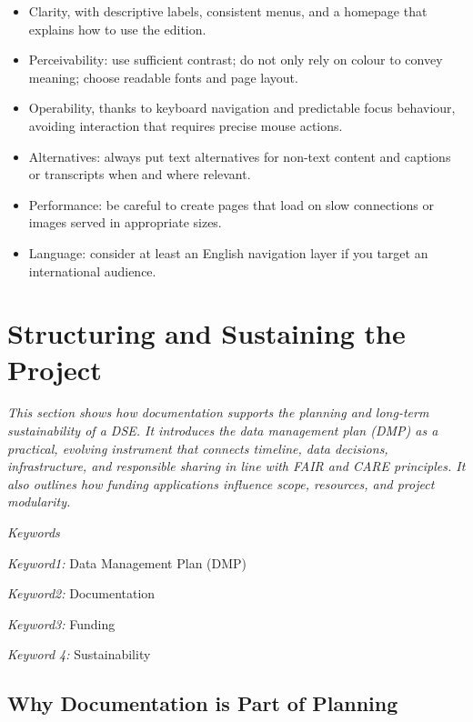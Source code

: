 \documentclass[
  letterpaper,
  DIV=11,
  numbers=noendperiod]{scrreprt}
\begin{document}
\begin{itemize}
\item
  Clarity, with descriptive labels, consistent menus, and a homepage
  that explains how to use the edition.
\item
  Perceivability: use sufficient contrast; do not only rely on colour to
  convey meaning; choose readable fonts and page layout.
\item
  Operability, thanks to keyboard navigation and predictable focus
  behaviour, avoiding interaction that requires precise mouse actions.
\item
  Alternatives: always put text alternatives for non-text content and
  captions or transcripts when and where relevant.
\item
  Performance: be careful to create pages that load on slow connections
  or images served in appropriate sizes.
\item
  Language: consider at least an English navigation layer if you target
  an international audience.~
\end{itemize}

\section{Structuring and Sustaining the
Project}\label{structuring-and-sustaining-the-project}

\emph{This section shows how documentation supports the planning and
long-term sustainability of a DSE. It introduces the data management
plan (DMP) as a practical, evolving instrument that connects timeline,
data decisions, infrastructure, and responsible sharing in line with
FAIR and CARE principles. It also outlines how funding applications
influence scope, resources, and project modularity.}

\emph{Keywords}

\emph{Keyword1:} Data Management Plan (DMP)

\emph{Keyword2:} Documentation

\emph{Keyword3:} Funding

\emph{Keyword 4:} Sustainability

\subsection{Why Documentation is Part of
Planning}\label{why-documentation-is-part-of-planning}
\end{document}
